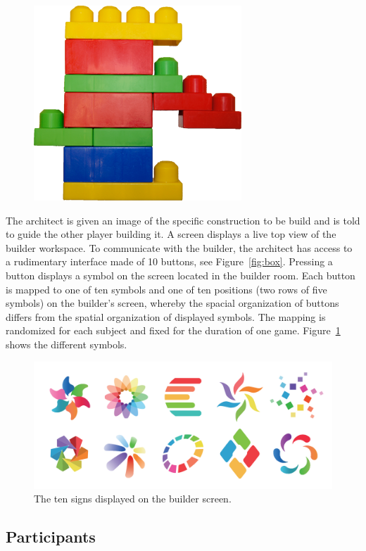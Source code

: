 \begin{figure}[!ht]
{    \includegraphics[height=0.2\columnwidth]{media/structures/3scaled} 
}
\caption{}
\end{figure}


The architect is given an image of the specific construction to be build and is told to guide the other player building it. A screen displays a live top view of the builder workspace. To communicate with the builder, the architect has access to a rudimentary interface made of 10 buttons, see Figure~\ref{fig:box}. Pressing a button displays a symbol on the screen located in the builder room. Each button is mapped to one of ten symbols and one of ten positions (two rows of five symbols) on the builder's screen, whereby the spacial organization of buttons differs from the spatial organization of displayed symbols. The mapping is randomized for each subject and fixed for the duration of one game. Figure~\ref{fig:sign} shows the different symbols.

\begin{figure}[!ht]
\centering
\includegraphics[width=0.8\columnwidth]{media/sign}%
\caption{The ten signs displayed on the builder screen.}
\label{fig:sign}
\end{figure}

\subsection{Participants}

